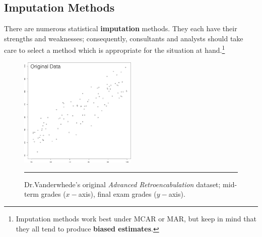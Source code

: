 \subsection{Imputation Methods}
There are numerous statistical \textbf{imputation} methods. They each have their strengths and weaknesses; consequently, consultants and analysts should take care to select a method which is appropriate for the situation at hand.\footnote{Imputation methods work best under MCAR or MAR, but keep in mind that they all tend to produce \textbf{biased estimates}.}
\begin{figure}[t]
\centering
\includegraphics[width=0.5\textwidth]{Images/original.png}
\caption[\small Dr.\@ Vanderwhede's original \textit{Advanced Retroencabulation} dataset]{\small Dr.\@ Vanderwhede's original \textit{Advanced Retroencabulation} dataset; mid-term grades ($x-$axis), final exam grades ($y-$axis).} \label{fig:ori}\hrule
\end{figure}
